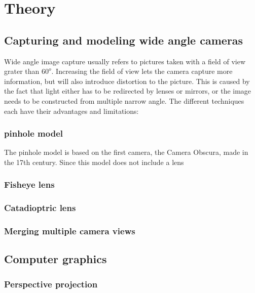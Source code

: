 
\chapter{Theory}

\section{Capturing and modeling wide angle cameras}

Wide angle image capture usually refers to pictures taken with a field of view grater than $60^o$. Increasing the field of view lets the camera capture more information, but will also introduce distortion to the picture. This is caused by the fact that light either has to be redirected by lenses or mirrors, or the image needs to be constructed from multiple narrow angle. The different techniques each have their advantages and limitations:

\subsection{pinhole model}
The pinhole model is based on the first camera, the Camera Obscura, made in the 17th century. Since this model does not include a lens

\subsection{Fisheye lens}

\subsection{Catadioptric lens}

\subsection{Merging multiple camera views}

\section{Computer graphics}

\subsection{Perspective projection}

